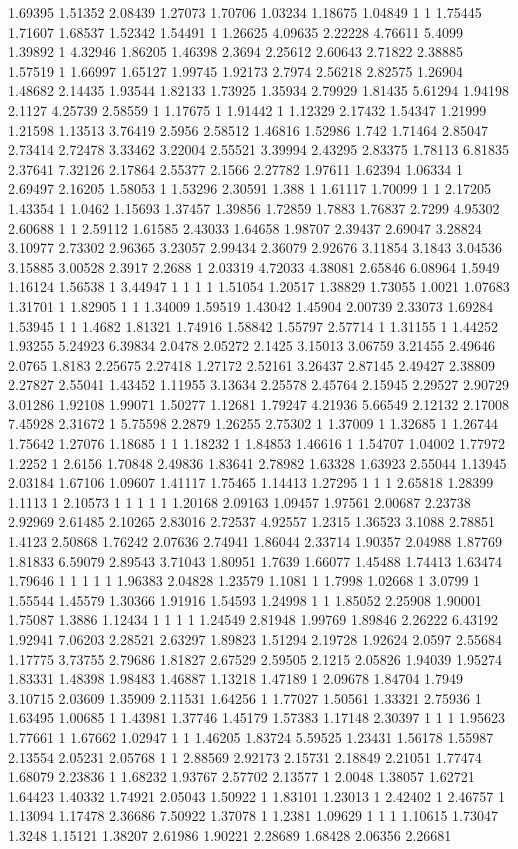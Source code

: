 1.69395 1.51352 2.08439 1.27073 1.70706 1.03234 1.18675 1.04849 1 1 1.75445 1.71607 1.68537 1.52342 1.54491 1 1.26625 4.09635 2.22228 4.76611 5.4099 1.39892 1 4.32946 1.86205 1.46398 2.3694 2.25612 2.60643 2.71822 2.38885 1.57519 1 1.66997 1.65127 1.99745 1.92173 2.7974 2.56218 2.82575 1.26904 1.48682 2.14435 1.93544 1.82133 1.73925 1.35934 2.79929 1.81435 5.61294 1.94198 2.1127 4.25739 2.58559 1 1.17675 1 1.91442 1 1.12329 2.17432 1.54347 1.21999 1.21598 1.13513 3.76419 2.5956 2.58512 1.46816 1.52986 1.742 1.71464 2.85047 2.73414 2.72478 3.33462 3.22004 2.55521 3.39994 2.43295 2.83375 1.78113 6.81835 2.37641 7.32126 2.17864 2.55377 2.1566 2.27782 1.97611 1.62394 1.06334 1 2.69497 2.16205 1.58053 1 1.53296 2.30591 1.388 1 1.61117 1.70099 1 1 2.17205 1.43354 1 1.0462 1.15693 1.37457 1.39856 1.72859 1.7883 1.76837 2.7299 4.95302 2.60688 1 1 2.59112 1.61585 2.43033 1.64658 1.98707 2.39437 2.69047 3.28824 3.10977 2.73302 2.96365 3.23057 2.99434 2.36079 2.92676 3.11854 3.1843 3.04536 3.15885 3.00528 2.3917 2.2688 1 2.03319 4.72033 4.38081 2.65846 6.08964 1.5949 1.16124 1.56538 1 3.44947 1 1 1 1 1.51054 1.20517 1.38829 1.73055 1.0021 1.07683 1.31701 1 1.82905 1 1 1.34009 1.59519 1.43042 1.45904 2.00739 2.33073 1.69284 1.53945 1 1 1.4682 1.81321 1.74916 1.58842 1.55797 2.57714 1 1.31155 1 1.44252 1.93255 5.24923 6.39834 2.0478 2.05272 2.1425 3.15013 3.06759 3.21455 2.49646 2.0765 1.8183 2.25675 2.27418 1.27172 2.52161 3.26437 2.87145 2.49427 2.38809 2.27827 2.55041 1.43452 1.11955 3.13634 2.25578 2.45764 2.15945 2.29527 2.90729 3.01286 1.92108 1.99071 1.50277 1.12681 1.79247 4.21936 5.66549 2.12132 2.17008 7.45928 2.31672 1 5.75598 2.2879 1.26255 2.75302 1 1.37009 1 1.32685 1 1.26744 1.75642 1.27076 1.18685 1 1 1.18232 1 1.84853 1.46616 1 1.54707 1.04002 1.77972 1.2252 1 2.6156 1.70848 2.49836 1.83641 2.78982 1.63328 1.63923 2.55044 1.13945 2.03184 1.67106 1.09607 1.41117 1.75465 1.14413 1.27295 1 1 1 2.65818 1.28399 1.1113 1 2.10573 1 1 1 1 1 1.20168 2.09163 1.09457 1.97561 2.00687 2.23738 2.92969 2.61485 2.10265 2.83016 2.72537 4.92557 1.2315 1.36523 3.1088 2.78851 1.4123 2.50868 1.76242 2.07636 2.74941 1.86044 2.33714 1.90357 2.04988 1.87769 1.81833 6.59079 2.89543 3.71043 1.80951 1.7639 1.66077 1.45488 1.74413 1.63474 1.79646 1 1 1 1 1 1.96383 2.04828 1.23579 1.1081 1 1.7998 1.02668 1 3.0799 1 1.55544 1.45579 1.30366 1.91916 1.54593 1.24998 1 1 1.85052 2.25908 1.90001 1.75087 1.3886 1.12434 1 1 1 1 1.24549 2.81948 1.99769 1.89846 2.26222 6.43192 1.92941 7.06203 2.28521 2.63297 1.89823 1.51294 2.19728 1.92624 2.0597 2.55684 1.17775 3.73755 2.79686 1.81827 2.67529 2.59505 2.1215 2.05826 1.94039 1.95274 1.83331 1.48398 1.98483 1.46887 1.13218 1.47189 1 2.09678 1.84704 1.7949 3.10715 2.03609 1.35909 2.11531 1.64256 1 1.77027 1.50561 1.33321 2.75936 1 1.63495 1.00685 1 1.43981 1.37746 1.45179 1.57383 1.17148 2.30397 1 1 1 1.95623 1.77661 1 1.67662 1.02947 1 1 1.46205 1.83724 5.59525 1.23431 1.56178 1.55987 2.13554 2.05231 2.05768 1 1 2.88569 2.92173 2.15731 2.18849 2.21051 1.77474 1.68079 2.23836 1 1.68232 1.93767 2.57702 2.13577 1 2.0048 1.38057 1.62721 1.64423 1.40332 1.74921 2.05043 1.50922 1 1.83101 1.23013 1 2.42402 1 2.46757 1 1.13094 1.17478 2.36686 7.50922 1.37078 1 1.2381 1.09629 1 1 1 1.10615 1.73047 1.3248 1.15121 1.38207 2.61986 1.90221 2.28689 1.68428 2.06356 2.26681 